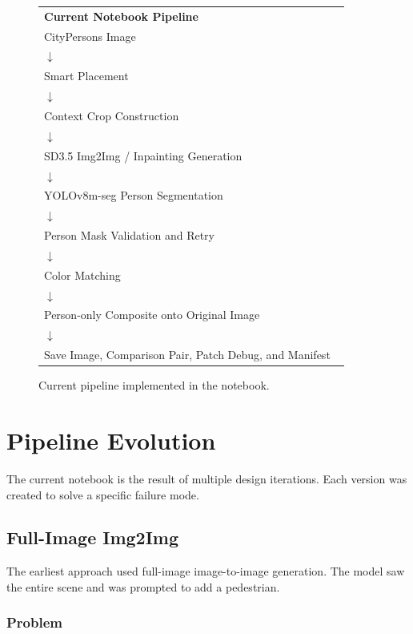 \documentclass[12pt,a4paper]{article}
\begin{document}
\begin{figure}[H]
\centering
\begin{tabular}{|p{0.9\linewidth}|}
\hline
\textbf{Current Notebook Pipeline} \\[4pt]
CityPersons Image \\
$\downarrow$ \\
Smart Placement \\
$\downarrow$ \\
Context Crop Construction \\
$\downarrow$ \\
SD3.5 Img2Img / Inpainting Generation \\
$\downarrow$ \\
YOLOv8m-seg Person Segmentation \\
$\downarrow$ \\
Person Mask Validation and Retry \\
$\downarrow$ \\
Color Matching \\
$\downarrow$ \\
Person-only Composite onto Original Image \\
$\downarrow$ \\
Save Image, Comparison Pair, Patch Debug, and Manifest \\
\hline
\end{tabular}
\caption{Current pipeline implemented in the notebook.}
\label{fig:current_pipeline}
\end{figure}

\section{Pipeline Evolution}

The current notebook is the result of multiple design iterations. Each version
was created to solve a specific failure mode.

\subsection{Full-Image Img2Img}

The earliest approach used full-image image-to-image generation. The model saw
the entire scene and was prompted to add a pedestrian.

\subsubsection{Problem}
\end{document}
